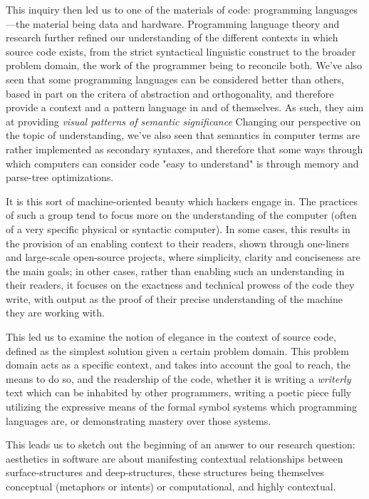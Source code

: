 \documentclass{article}
\begin{document}
This inquiry then led us to one of the materials of code: programming languages—the material being data and hardware. Programming language theory and research further refined our understanding of the different contexts in which source code exists, from the strict syntactical linguistic construct to the broader problem domain, the work of the programmer being to reconcile both. We've also seen that some programming languages can be considered better than others, based in part on the critera of abstraction and orthogonality, and therefore provide a context and a pattern language in and of themselves. As such, they aim at providing \emph{visual patterns of semantic significance} Changing our perspective on the topic of understanding, we've also seen that semantics in computer terms are rather implemented as secondary syntaxes, and therefore that some ways through which computers can consider code "easy to understand" is through memory and parse-tree optimizations.

It is this sort of machine-oriented beauty which hackers engage in. The practices of such a group tend to focus more on the understanding of the computer (often of a very specific physical or syntactic computer). In some cases, this results in the provision of an enabling context to their readers, shown through one-liners and large-scale open-source projects, where simplicity, clarity and conciseness are the main goals; in other cases, rather than enabling such an understanding in their readers, it focuses on the exactness and technical prowess of the code they write, with output as the proof of their precise understanding of the machine they are working with.

This led us to examine the notion of elegance in the context of source code, defined as the simplest solution given a certain problem domain. This problem domain acts as a specific context, and takes into account the goal to reach, the means to do so, and the readership of the code, whether it is writing a \emph{writerly} text\cite{barthes_s-z_1977} which can be inhabited by other programmers, writing a poetic piece fully utilizing the expressive means of the formal symbol systems which programming languages are, or demonstrating mastery over those systems.

This leads us to sketch out the beginning of an answer to our research question: aesthetics in software are about manifesting contextual relationships between surface-structures and deep-structures, these structures being themselves conceptual (metaphors or intents) or computational, and highly contextual.
\end{document}
